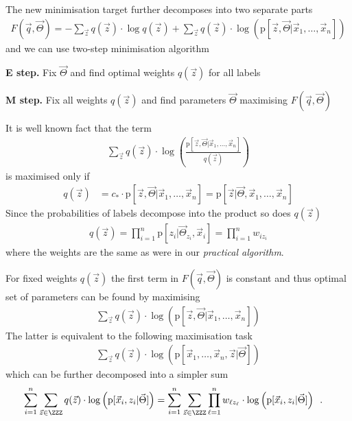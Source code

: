 \documentclass[landscape,footrule]{foils}
\newcommand{\pd}[1]{\mathrm{p}[#1]}
\begin{document}
The new minimisation target further decomposes into two separate parts
\begin{align*}
F(\vec{q},\vec{\Theta})= -\sum_{\vec{z}}q(\vec{z})\cdot\log q(\vec{z})+
 \sum_{\vec{z}}q(\vec{z})\cdot\log\left(\pd{\vec{z},\vec{\Theta}|\vec{x}_1,\ldots,\vec{x}_n}\right)
\end{align*}
and we can use two-step minimisation algorithm
\vspace*{1cm}

\textbf{E step.} Fix $\vec{\Theta}$ and find optimal weights $q(\vec{z})$ for all labels

\textbf{M step.} Fix all weights $q(\vec{z})$ and find parameters $\vec{\Theta}$ maximising $F(\vec{q},\vec{\Theta})$



It is well known fact that the term 
\begin{align*}
 \sum_{\vec{z}}q(\vec{z})\cdot\log\left(\frac{\pd{\vec{z},\vec{\Theta}|\vec{x}_1,\ldots,\vec{x}_n}}{q(\vec{z})}\right)
\end{align*}
is maximised only if 
\begin{align*}
q(\vec{z})&= c_*\cdot \pd{\vec{z},\vec{\Theta}|\vec{x}_1,\ldots,\vec{x}_n}=\pd{\vec{z}|\vec{\Theta},\vec{x}_1,\ldots,\vec{x}_n}
\end{align*}
Since the probabilities of labels decompose into the product so does $q(\vec{z})$
\begin{align*}
q(\vec{z})=\prod_{i=1}^n \pd{z_i|\vec{\Theta}_{z_i},\vec{x}_i}=\prod_{i=1}^n w_{iz_i}
\end{align*}
where the weights are the same as were in our \emph{practical algorithm}. 


For fixed weights $q(\vec{z})$ the first term in $F(\vec{q},\vec{\Theta})$ is constant and thus optimal set of parameters can be found by maximising
\begin{align*}
 \sum_{\vec{z}}q(\vec{z})\cdot\log\left(\pd{\vec{z},\vec{\Theta}|\vec{x}_1,\ldots,\vec{x}_n}\right)
\end{align*}
The latter is equivalent to the following maximisation task
\begin{align*}
 \sum_{\vec{z}}q(\vec{z})\cdot\log\left(\pd{\vec{x}_1,\ldots,\vec{x}_n, \vec{z}|\vec{\Theta}}\right)
\end{align*}
which can be further decomposed into a simpler sum
\begin{align*}
\sum_{i=1}^n \sum_{\vec{z}\in\ZZZ} q(\vec{z})\cdot\log\left(\pd{\vec{x}_i,z_i|\vec{\Theta}}\right)
&=\sum_{i=1}^n \sum_{\vec{z}\in\ZZZ}\prod_{\ell=1}^n w_{\ell z_\ell}\cdot\log\left(\pd{\vec{x}_i,z_i|\vec{\Theta}}\right)
\enspace.
\end{align*}
\end{document}
